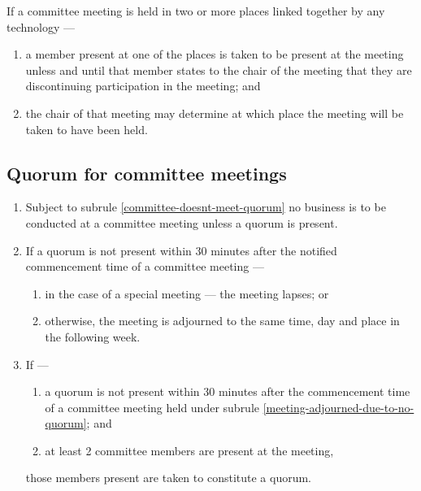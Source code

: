 \documentclass[../constitution.tex]{subfiles}
\begin{document}
If a committee meeting is held in two or more places linked together by any technology ---

\begin{enumerate}

  \item a member present at one of the places is taken to be present at the meeting unless and until that member states to the chair of the meeting that they are discontinuing participation in the meeting; and

  \item the chair of that meeting may determine at which place the meeting will be taken to have been held.

\end{enumerate}



\hypertarget{quorum-for-committee-meetings}{%
  \subsection{Quorum for committee meetings}\label{quorum-for-committee-meetings}}

\begin{enumerate}

  \item Subject to subrule \ref{committee-doesnt-meet-quorum} no business is to be conducted at a committee meeting unless a quorum is present.
  \item If a quorum is not present within 30 minutes after the notified commencement time of a committee meeting --- \label{no-quorum-after-30min}

        \begin{enumerate}
          \item in the case of a special meeting --- the meeting lapses; or
          \item otherwise, the meeting is adjourned to the same time, day and place in the following week. \label{meeting-adjourned-due-to-no-quorum}
        \end{enumerate}
  \item If ---

        \begin{enumerate}

          \item a quorum is not present within 30 minutes after the commencement time of a committee meeting held under subrule \ref{meeting-adjourned-due-to-no-quorum}; and
          \item at least 2 committee members are present at the meeting,
        \end{enumerate}

        those members present are taken to constitute a quorum.

\end{enumerate}
\end{document}
